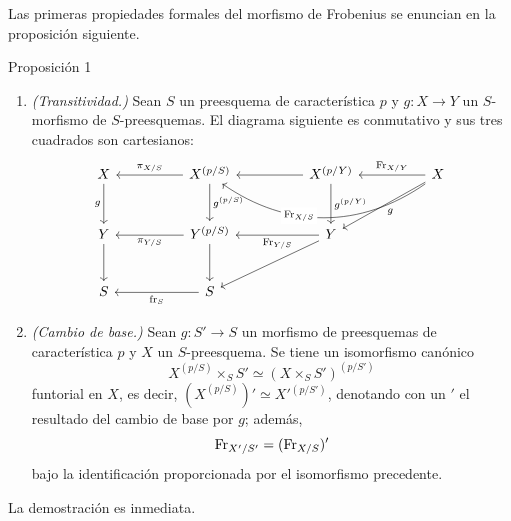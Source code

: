 Las primeras propiedades formales del morfismo de Frobenius se enuncian en la proposición siguiente.

\begin{statement}{Proposición 1}
\begin{enumerate}[label=\alph*)]
\item \emph{(Transitividad.)} Sean $S$ un preesquema de característica $p$ y $g:X\to Y$ un $S$-morfismo de $S$-preesquemas. El diagrama siguiente es conmutativo y sus tres cuadrados son cartesianos:
\[
\begin{tikzcd}[column sep=huge,row sep=large]
X \arrow[d,"g"'] & X^{(p/S)} \arrow[l,"\pi_{X/S}"'] \arrow[d,"g^{(p/S)}"] & X^{(p/Y)} \arrow[l] \arrow[d,"g^{(p/Y)}"] & X \arrow[l,"\Fr_{X/Y}"'] \arrow[ll,bend left=35,"\Fr_{X/S}"{description,pos=0.62}] \arrow[dl,"g"] \\
Y \arrow[d] & Y^{(p/S)} \arrow[l,"\pi_{Y/S}"] \arrow[d] & Y \arrow[l,"\Fr_{Y/S}"] \arrow[dl] & {} \\
S & S \arrow[l,"\fr_S"] & {} & {}
\end{tikzcd}
\]

\item \emph{(Cambio de base.)} Sean $g:S'\to S$ un morfismo de preesquemas de característica $p$ y $X$ un $S$-preesquema. Se tiene un isomorfismo canónico
\[
X^{(p/S)}\times_S S'\simeq (X\times_S S')^{(p/S')}
\]
funtorial en $X$, es decir, $(X^{(p/S)})'\simeq X'{}^{(p/S')}$, denotando con un $'$ el resultado del cambio de base por $g$; además,
\[
\operatorname{Fr}_{X'/S'}=(\operatorname{Fr}_{X/S})'
\]
bajo la identificación proporcionada por el isomorfismo precedente.
\end{enumerate}
\end{statement}

La demostración es inmediata.
